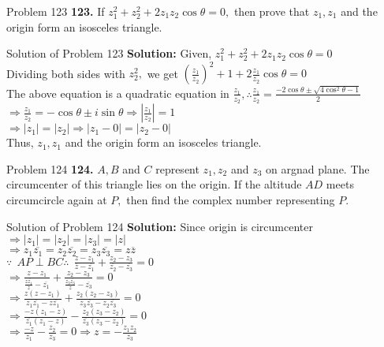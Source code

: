 \documentclass[aspectratio=169,8pt]{beamer}
\begin{document}
\begin{frame}{Problem 123}
  \textbf{123.} If $z_1^2 + z_2^2 + 2z_1z_2\cos\theta = 0,$ then prove that $z_1, z_1$ and the origin form an isosceles triangle.
\end{frame}
\begin{frame}{Solution of Problem 123}
  \textbf{Solution:} Given, $z_1^2 + z_2^2 + 2z_1z_2\cos\theta = 0$\\
  \vspace*{0.2cm}
  Dividing both sides with $z_2^2,$ we get $\left(\frac{z_1}{z_2}\right)^2 + 1 + 2\frac{z_1}{z_2}\cos\theta = 0$\\
  \vspace*{0.2cm}
  The above equation is a quadratic equation in $\frac{z_1}{z_2}, \therefore \frac{z_1}{z_2} = \frac{-2\cos\theta
    \pm\sqrt{4\cos^2\theta - 1}}{2}$\\
  \vspace*{0.2cm}
  $\Rightarrow \frac{z_1}{z_2} = -\cos\theta \pm i\sin\theta \Rightarrow \left|\frac{z_1}{z_2}\right| = 1$\\
  \vspace*{0.2cm}
  $\Rightarrow |z_1| = |z_2| \Rightarrow |z_1 - 0| = |z_2 - 0|$\\
  \vspace*{0.2cm}
  Thus, $z_1, z_1$ and the origin form an isosceles triangle.
\end{frame}
\begin{frame}{Problem 124}
  \textbf{124.} $A, B$ and $C$ represent $z_1, z_2$ and $z_3$ on argnad plane. The circumcenter of this triangle lies on the
  origin. If the altitude $AD$ meets circumcircle again at $P,$ then find the complex number representing $P.$
\end{frame}
\begin{frame}{Solution of Problem 124}
  \textbf{Solution:} Since origin is circumcenter $\Rightarrow |z_1| = |z_2| = |z_3| = |z|$\\
  \vspace*{0.2cm}
  $\Rightarrow z_1\overline{z_1} = z_2\overline{z_2} = z_3\overline{z_3} = z\overline{z}$\\
  \vspace*{0.2cm}
  $\because~~AP\perp BC \therefore~~\frac{z - z_1}{\overline{z} - \overline{z_1}} + \frac{z_2 - z_3}{\overline{z_2} -
    \overline{z_3}} = 0$
  \\
  \vspace*{0.2cm}
  $\Rightarrow \frac{z - z_1}{\frac{z\overline{z_1}}{z} - \overline{z_1}} + \frac{z_2 - z_3}{\frac{z_3\overline{z_3}}{z} -
    \overline{z_3}} = 0$\\
  \vspace*{0.2cm}
  $\Rightarrow \frac{z(z - z_1)}{z_1\overline{z_1} - z\overline{z_1}} + \frac{z_2(z_2 - z_3)}{z_3\overline{z_3} -
    z_2\overline{z_3}} = 0$\\
  \vspace*{0.2cm}
  $\Rightarrow \frac{-z(z_1 - z)}{\overline{z_1}(z_1 - z)} - \frac{z_2(z_3 - z_2)}{\overline{z_3}(z_3 - z_2)} = 0$\\
  \vspace*{0.2cm}
  $\Rightarrow \frac{-z}{z_1} - \frac{z_2}{z_3} = 0 \Rightarrow z = -\frac{z_1z_2}{z_3}$
\end{frame}
\end{document}
